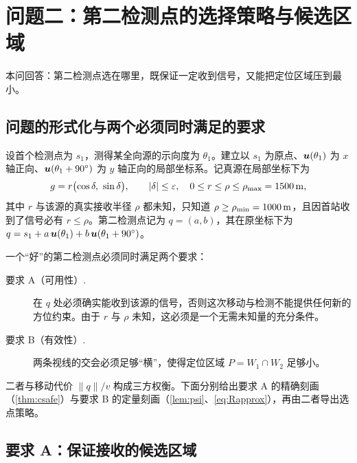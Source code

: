 \section{问题二：第二检测点的选择策略与候选区域}\label{sec:q2}

本问回答：第二检测点选在哪里，既保证一定收到信号，又能把定位区域压到最小。

\subsection{问题的形式化与两个必须同时满足的要求}

设首个检测点为 $s_1$，测得某全向源的示向度为 $\theta_1$。建立以 $s_1$ 为原点、$\bm{u}(\theta_1)$ 为 $x$ 轴正向、$\bm{u}(\theta_1+90^\circ)$ 为 $y$ 轴正向的局部坐标系。记真源在局部坐标下为
\begin{equation}\label{eq:localg}
  g=r\bigl(\cos\delta,\ \sin\delta\bigr),\qquad |\delta|\le\varepsilon,\quad 0\le r\le\rho\le\rho_{\max}=1500\,\mathrm{m} ,
\end{equation}
其中 $r$ 与该源的真实接收半径 $\rho$ 都未知，只知道 $\rho\ge\rho_{\min}=1000\,\mathrm{m}$，且因首站收到了信号必有 $r\le\rho$。第二检测点记为 $q=(a,b)$，其在原坐标下为 $q=s_1+a\,\bm{u}(\theta_1)+b\,\bm{u}(\theta_1+90^\circ)$。

一个“好”的第二检测点必须同时满足两个要求：

\begin{description}
  \item[要求 A（可用性）.] 在 $q$ 处必须确实能收到该源的信号，否则这次移动与检测不能提供任何新的方位约束。由于 $r$ 与 $\rho$ 未知，这必须是一个无需未知量的充分条件。
  \item[要求 B（有效性）.] 两条视线的交会必须足够“横”，使得定位区域 $P=W_1\cap W_2$ 足够小。
\end{description}

二者与移动代价 $\|q\|/v$ 构成三方权衡。下面分别给出要求 A 的精确刻画（\cref{thm:csafe}）与要求 B 的定量刻画（\cref{lem:psi}、\cref{eq:Rapprox}），再由二者导出选点策略。

\subsection{要求 A：保证接收的候选区域}

